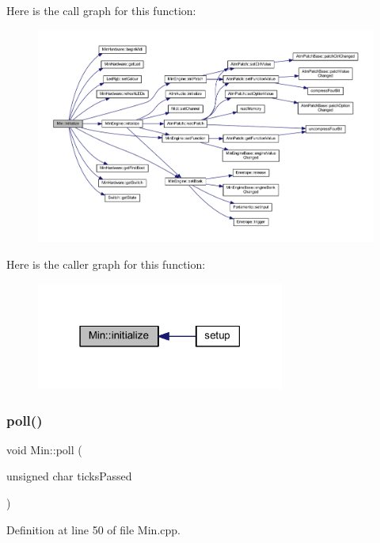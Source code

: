 Here is the call graph for this function\+:
\nopagebreak
\begin{figure}[H]
\begin{center}
\leavevmode
\includegraphics[width=350pt]{dd/d34/class_min_a0fbb740ee813f44c6b0082d9a980875c_cgraph}
\end{center}
\end{figure}
Here is the caller graph for this function\+:
\nopagebreak
\begin{figure}[H]
\begin{center}
\leavevmode
\includegraphics[width=231pt]{dd/d34/class_min_a0fbb740ee813f44c6b0082d9a980875c_icgraph}
\end{center}
\end{figure}
\mbox{\label{class_min_a4ed53c28c8c59dba741daf945dbc160b}} 
\subsubsection{\texorpdfstring{poll()}{poll()}}
{\footnotesize\ttfamily void Min\+::poll (\begin{DoxyParamCaption}\item[{unsigned char}]{ticks\+Passed }\end{DoxyParamCaption})}



Definition at line 50 of file Min.\+cpp.

